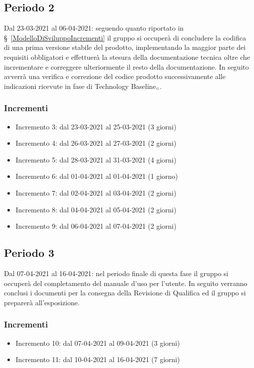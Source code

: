 \subsection{Periodo 2}\label{PianificazioneProgettazioneDettaglioPeriodo2}
Dal 23-03-2021 al 06-04-2021: seguendo quanto riportato in \S~\ref{ModelloDiSviluppoIncrementi} il gruppo si occuperà di concludere la codifica di una prima versione stabile del prodotto, implementando la maggior parte dei requisiti obbligatori e effettuerà la stesura della documentazione tecnica oltre che incrementare e correggere ulteriormente il resto della documentazione. In seguito avverrà una verifica e correzione del codice prodotto successivamente alle indicazioni ricevute in fase di Technology Baseline$_{\scaleto{G}{3pt}}$.
\subsubsection{Incrementi}\label{PianificazioneProgettazioneDettaglioPeriodo2Incrementi}
\begin{itemize}
	\item Incremento 3: dal 23-03-2021 al 25-03-2021 (3 giorni)
	\item Incremento 4: dal 26-03-2021 al 27-03-2021 (2 giorni)
	\item Incremento 5: dal 28-03-2021 al 31-03-2021 (4 giorni)
	\item Incremento 6: dal 01-04-2021 al 01-04-2021 (1 giorno)
	\item Incremento 7: dal 02-04-2021 al 03-04-2021 (2 giorni)
	\item Incremento 8: dal 04-04-2021 al 05-04-2021 (2 giorni)
	\item Incremento 9: dal 06-04-2021 al 07-04-2021 (2 giorni)
\end{itemize}
\subsection{Periodo 3}\label{PianificazioneProgettazioneDettaglioPeriodo3}
Dal 07-04-2021 al 16-04-2021: nel periodo finale di questa fase il gruppo si occuperà del completamento del manuale d'uso per l'utente. In seguito verranno conclusi i documenti per la consegna della Revisione di Qualifica ed il gruppo si preparerà all'esposizione.
\subsubsection{Incrementi}\label{PianificazioneProgettazioneDettaglioPeriodo3Incrementi}
\begin{itemize}
	\item Incremento 10: dal 07-04-2021 al 09-04-2021 (3 giorni)
	\item Incremento 11: dal 10-04-2021 al 16-04-2021 (7 giorni)
\end{itemize}
\clearpage
